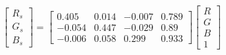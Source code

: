 \begin{equation}
\begin{bmatrix}
  R_s \\ G_s \\ B_s 
\end{bmatrix}=
\left[\begin{matrix}0.405 & 0.014 & -0.007 & 0.789\\ 
-0.054 & 0.447 & -0.029 & 0.89\\ 
-0.006 & 0.058 & 0.299 & 0.933\end{matrix}\right]
\begin{bmatrix}
  R \\ G \\ B \\ 1 
\end{bmatrix}
\end{equation}

